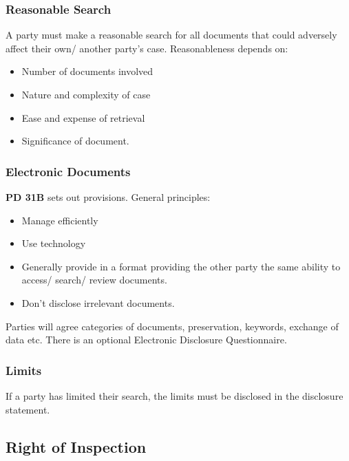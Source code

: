 \documentclass[
]{article}
\providecommand{\tightlist}{%
  \setlength{\itemsep}{0pt}\setlength{\parskip}{0pt}}
\begin{document}
\hypertarget{reasonable-search}{%
\subsubsection{Reasonable Search}\label{reasonable-search}}

A party must make a reasonable search for all documents that could
adversely affect their own/ another party's case. Reasonableness depends
on:

\begin{itemize}
\tightlist
\item
  Number of documents involved
\item
  Nature and complexity of case
\item
  Ease and expense of retrieval
\item
  Significance of document.
\end{itemize}

\hypertarget{electronic-documents}{%
\subsubsection{Electronic Documents}\label{electronic-documents}}

\textbf{PD 31B} sets out provisions. General principles:

\begin{itemize}
\tightlist
\item
  Manage efficiently
\item
  Use technology
\item
  Generally provide in a format providing the other party the same
  ability to access/ search/ review documents.
\item
  Don't disclose irrelevant documents.
\end{itemize}

Parties will agree categories of documents, preservation, keywords,
exchange of data etc. There is an optional Electronic Disclosure
Questionnaire.

\hypertarget{limits}{%
\subsubsection{Limits}\label{limits}}

If a party has limited their search, the limits must be disclosed in the
disclosure statement.

\hypertarget{right-of-inspection}{%
\subsection{Right of Inspection}\label{right-of-inspection}}
\end{document}

